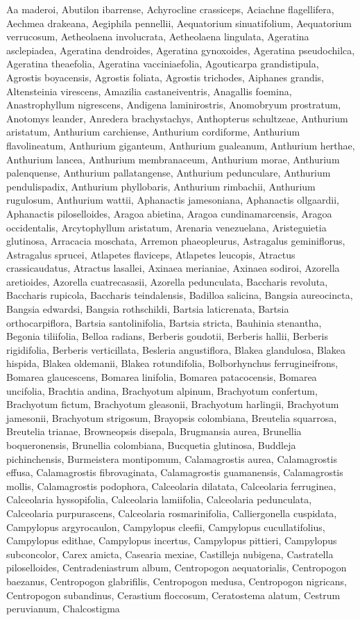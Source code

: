 \documentclass[]{article}
\begin{document}
Aa maderoi, Abutilon ibarrense, Achyrocline crassiceps, Aciachne flagellifera, Aechmea drakeana, Aegiphila pennellii, Aequatorium sinuatifolium, Aequatorium verrucosum, Aetheolaena involucrata, Aetheolaena lingulata, Ageratina asclepiadea, Ageratina dendroides, Ageratina gynoxoides, Ageratina pseudochilca, Ageratina theaefolia, Ageratina vacciniaefolia, Agouticarpa grandistipula, Agrostis boyacensis, Agrostis foliata, Agrostis trichodes, Aiphanes grandis, Altensteinia virescens, Amazilia castaneiventris, Anagallis foemina, Anastrophyllum nigrescens, Andigena laminirostris, Anomobryum prostratum, Anotomys leander, Anredera brachystachys, Anthopterus schultzeae, Anthurium aristatum, Anthurium carchiense, Anthurium cordiforme, Anthurium flavolineatum, Anthurium giganteum, Anthurium gualeanum, Anthurium herthae, Anthurium lancea, Anthurium membranaceum, Anthurium morae, Anthurium palenquense, Anthurium pallatangense, Anthurium pedunculare, Anthurium pendulispadix, Anthurium phyllobaris, Anthurium rimbachii, Anthurium rugulosum, Anthurium wattii, Aphanactis jamesoniana, Aphanactis ollgaardii, Aphanactis piloselloides, Aragoa abietina, Aragoa cundinamarcensis, Aragoa occidentalis, Arcytophyllum aristatum, Arenaria venezuelana, Aristeguietia glutinosa, Arracacia moschata, Arremon phaeopleurus, Astragalus geminiflorus, Astragalus sprucei, Atlapetes flaviceps, Atlapetes leucopis, Atractus crassicaudatus, Atractus lasallei, Axinaea merianiae, Axinaea sodiroi, Azorella aretioides, Azorella cuatrecasasii, Azorella pedunculata, Baccharis revoluta, Baccharis rupicola, Baccharis teindalensis, Badilloa salicina, Bangsia aureocincta, Bangsia edwardsi, Bangsia rothschildi, Bartsia laticrenata, Bartsia orthocarpiflora, Bartsia santolinifolia, Bartsia stricta, Bauhinia stenantha, Begonia tiliifolia, Belloa radians, Berberis goudotii, Berberis hallii, Berberis rigidifolia, Berberis verticillata, Besleria angustiflora, Blakea glandulosa, Blakea hispida, Blakea oldemanii, Blakea rotundifolia, Bolborhynchus ferrugineifrons, Bomarea glaucescens, Bomarea linifolia, Bomarea patacocensis, Bomarea uncifolia, Brachtia andina, Brachyotum alpinum, Brachyotum confertum, Brachyotum fictum, Brachyotum gleasonii, Brachyotum harlingii, Brachyotum jamesonii, Brachyotum strigosum, Brayopsis colombiana, Breutelia squarrosa, Breutelia trianae, Browneopsis disepala, Brugmansia aurea, Brunellia boqueronensis, Brunellia colombiana, Bucquetia glutinosa, Buddleja pichinchensis, Burmeistera montipomum, Calamagrostis aurea, Calamagrostis effusa, Calamagrostis fibrovaginata, Calamagrostis guamanensis, Calamagrostis mollis, Calamagrostis podophora, Calceolaria dilatata, Calceolaria ferruginea, Calceolaria hyssopifolia, Calceolaria lamiifolia, Calceolaria pedunculata, Calceolaria purpurascens, Calceolaria rosmarinifolia, Calliergonella cuspidata, Campylopus argyrocaulon, Campylopus cleefii, Campylopus cucullatifolius, Campylopus edithae, Campylopus incertus, Campylopus pittieri, Campylopus subconcolor, Carex amicta, Casearia mexiae, Castilleja nubigena, Castratella piloselloides, Centradeniastrum album, Centropogon aequatorialis, Centropogon baezanus, Centropogon glabrifilis, Centropogon medusa, Centropogon nigricans, Centropogon subandinus, Cerastium floccosum, Ceratostema alatum, Cestrum peruvianum, Chalcostigma 
\end{document}
